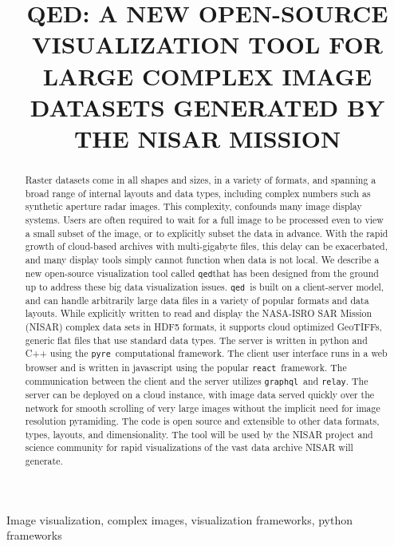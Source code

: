 \documentclass{article}
\title{QED: A NEW OPEN-SOURCE VISUALIZATION TOOL FOR LARGE COMPLEX IMAGE DATASETS
GENERATED BY THE NISAR MISSION}
\def\graphql{{\tt graphql}}
\def\pyre{{\tt pyre}}
\def\qed{{\tt qed}}
\def\react{{\tt react}}
\def\relay{{\tt relay}}
\begin{document}
%
\maketitle
%
\begin{abstract}
Raster datasets come in all shapes and sizes, in a variety of formats, and spanning a
broad range of internal layouts and data types, including complex numbers such as
synthetic aperture radar images. This complexity, confounds many image display systems.
Users are often required to wait for a full image to be processed even to view a small
subset of the image, or to explicitly subset the data in advance. With the rapid growth of
cloud-based archives with multi-gigabyte files, this delay can be exacerbated, and many
display tools simply cannot function when data is not local. We describe a new open-source
visualization tool called \qed that has been designed from the ground up to address these
big data visualization issues. \qed\ is built on a client-server model, and can handle
arbitrarily large data files in a variety of popular formats and data layouts. While
explicitly written to read and display the NASA-ISRO SAR Mission (NISAR) complex data sets
in HDF5 formats, it supports cloud optimized GeoTIFFs, generic flat files that use
standard data types. The server is written in python and C++ using the \pyre\
computational framework. The client user interface runs in a web browser and is written in
javascript using the popular \react\ framework. The communication between the client and
the server utilizes \graphql\ and \relay. The server can be deployed on a cloud instance,
with image data served quickly over the network for smooth scrolling of very large images
without the implicit need for image resolution pyramiding. The code is open source and
extensible to other data formats, types, layouts, and dimensionality. The tool will be
used by the NISAR project and science community for rapid visualizations of the vast data
archive NISAR will generate.
\end{abstract}
%
\begin{keywords}
Image visualization, complex images, visualization frameworks, python frameworks
\end{keywords}
%
\end{document}
